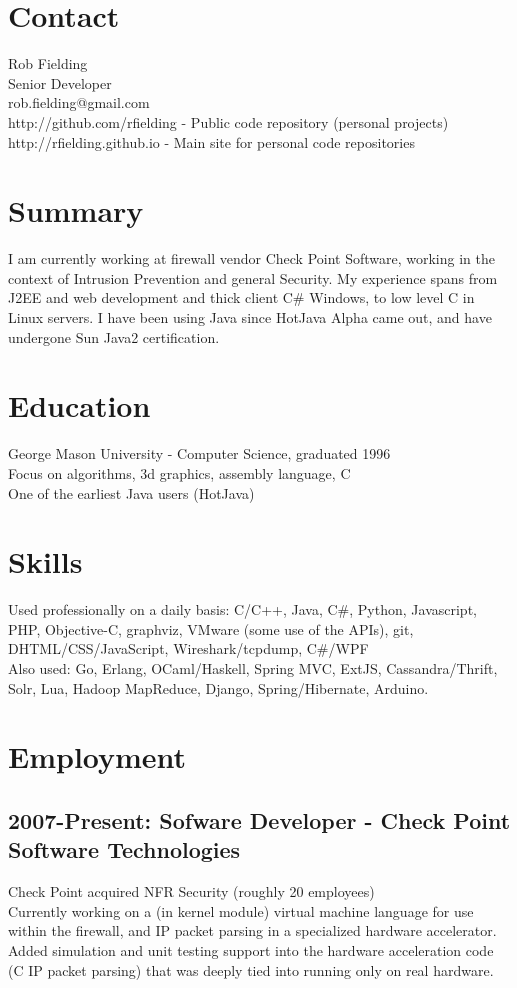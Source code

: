 \documentclass[margin]{res}
\begin{document}
\begin{resume}
\section{Contact}
Rob Fielding \\
Senior Developer \\
rob.fielding@gmail.com \\
http://github.com/rfielding - Public code repository (personal projects) \\
http://rfielding.github.io - Main site for personal code repositories

\section{Summary}
I am currently working at firewall vendor Check Point Software,
working in the context of Intrusion Prevention and general Security.
My experience spans from J2EE and web development and thick client
C\# Windows, to low level C in Linux servers.
I have been using Java since HotJava Alpha came out, and have undergone
Sun Java2 certification.

\section{Education}
George Mason University - Computer Science, graduated 1996 \\
Focus on algorithms, 3d graphics, assembly language, C \\
One of the earliest Java users (HotJava) 

\section{Skills}
Used professionally on a daily basis: C/C++, Java, C\#, Python, Javascript, PHP, Objective-C, graphviz, VMware (some use of the APIs), git, DHTML/CSS/JavaScript, Wireshark/tcpdump, C\#/WPF \\

Also used: Go, Erlang, OCaml/Haskell, Spring MVC, ExtJS, Cassandra/Thrift, Solr, Lua, Hadoop MapReduce, Django, Spring/Hibernate, Arduino. 

\section{Employment}
\subsection{2007-Present: Sofware Developer - Check Point Software Technologies}
Check Point acquired NFR Security (roughly 20 employees) \\
Currently working on a (in kernel module) virtual machine language for use within the firewall, and IP packet parsing in a specialized hardware accelerator.
Added simulation and unit testing support into the hardware acceleration code (C IP packet parsing) that was deeply tied into running only on real hardware.  \\


\end{resume}
\end{document}
